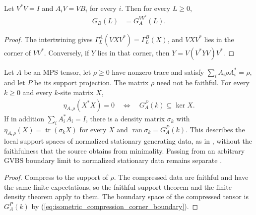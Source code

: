\begin{lemma}
    \label{thm:isometric_compression_corner_boundary}
    \leanok
    Let $V^*V=I$ and $A_iV=VB_i$ for every $i$. Then for every $L\geq0$,
    \begin{align}
        G_B(L) & =G_A^{VV^*}(L).
        \label{eq:isometric_compression_corner_boundary}
    \end{align}
\end{lemma}
\begin{proof}\leanok
    The intertwining gives $\Gamma_L^A(VXV^*)=\Gamma_L^B(X)$, and
    $VXV^*$ lies in the corner of $VV^*$. Conversely, if $Y$ lies in that
    corner, then $Y=V(V^*YV)V^*$.
\end{proof}

\begin{lemma}
    \label{thm:stationary_local_support}
    \leanok
    Let $A$ be an MPS tensor, let $\rho\geq0$ have nonzero trace and satisfy
    $\sum_iA_i\rho A_i^*=\rho$, and let $P$ be its support projection.
    The matrix $\rho$ need not be faithful. For every $k\geq0$ and every
    $k$-site matrix $X$,
    \begin{align}
        \eta_{A,\rho}(X^*X)=0
        \quad\Longleftrightarrow\quad
        G_A^P(k)\subseteq\ker X.
        \label{eq:stationary_local_support}
    \end{align}
    If in addition $\sum_iA_i^*A_i=I$, there is a density matrix $\sigma_k$
    with $\eta_{A,\rho}(X)=\operatorname{tr}(\sigma_kX)$ for every $X$ and
    $\operatorname{ran}\sigma_k=G_A^P(k)$.
    This describes the local support spaces of normalized stationary
    generating data, as in \cite[Section~3 and the proof of the overlap
        lemma in Section~4]{Nachtergaele1996Spectral}, without the faithfulness
    that the source obtains from minimality. Passing from an arbitrary
    GVBS boundary limit to normalized stationary data remains separate
    \cite{gap:nachtergaele96_infinite_volume_ground_projection}.
\end{lemma}
\begin{proof}\leanok
    Compress to the support of $\rho$. The compressed data are faithful
    and have the same finite expectations, so the faithful support
    theorem and the finite-density theorem apply to them. The boundary
    space of the compressed tensor is $G_A^P(k)$ by
    (\ref{eq:isometric_compression_corner_boundary}).
\end{proof}

